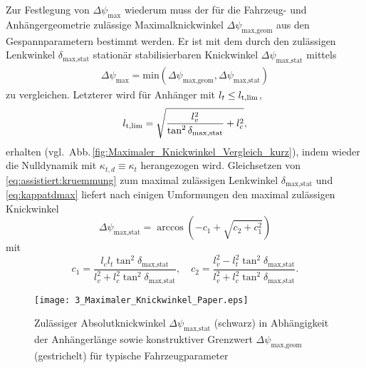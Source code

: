 Zur Festlegung von $\Delta\psi_\text{max}$ wiederum muss der für die Fahrzeug- und Anhängergeometrie zulässige Maximalknickwinkel $\Delta\psi_\text{max,geom}$ aus den Gespannparametern bestimmt werden. Er ist mit dem durch den zulässigen Lenkwinkel $\delta_{\text{max},\text{stat}}$ stationär stabilisierbaren Knickwinkel $\Delta\psi_\text{max,stat}$ mittels
\begin{align}
	\Delta\psi_\text{max} = \text{min}(\Delta\psi_\text{max,geom}, \Delta\psi_\text{max,stat})
\end{align}
 zu vergleichen. Letzterer wird für Anhänger mit $l_t \leq l_{\rm t,lim}$,
\begin{equation*}
	l_{\rm t,lim} = \sqrt{\frac{l_v^2}{\tan^2\delta_{\text{max},\text{stat}}}+l_c^2}, %
\end{equation*}
erhalten (vgl.\ Abb.\,\ref{fig:Maximaler_Knickwinkel_Vergleich_kurz}), indem wieder
die Nulldynamik mit $\kappa_{t,d} \equiv \kappa_{t}$ herangezogen wird. Gleichsetzen von \eqref{eq:assistiert:kruemmung} zum maximal zulässigen Lenkwinkel $\delta_{\text{max},\text{stat}}$ und  \eqref{eq:kappatdmax} liefert nach einigen Umformungen den maximal zulässigen Knickwinkel
\begin{equation}
	\Delta\psi_{\text{max},\text{stat}} = \arccos\left( -c_1 + \sqrt{c_2 + c_1^2} \right) \label{equ:eta_max_stat}
\end{equation}
mit
\begin{equation*}
	c_1 = \frac{l_c l_t \tan^2\delta_{\text{max},\text{stat}}}{l_v^2 + l_c^2 \tan^2\delta_{\text{max},\text{stat}}}, \quad
	c_2 = \frac{l_v^2 - l_t^2 \tan^2\delta_{\text{max},\text{stat}}}{l_v^2 + l_c^2 \tan^2\delta_{\text{max},\text{stat}}}.
\end{equation*}


\begin{figure}[ht]
	\centering
	\def\xlabel{$l_t$ in \unit{m}}
	\def\ylabel{$\Delta\psi_\text{max,geom}, \Delta\psi_\text{max,stat}$ in \unit{rad}}	
	
	\renewcommand{\matlabtextB}{\small}
	\texttt{[image: 3\_Maximaler\_Knickwinkel\_Paper.eps]}
    \caption[Zulässiger Absolutknickwinkel]{Zulässiger Absolutknickwinkel $\Delta\psi_\text{max,stat}$ (schwarz) in Abhängigkeit der Anhängerlänge sowie konstruktiver Grenzwert $\Delta\psi_\text{max,geom}$ (gestrichelt) für typische Fahrzeugparameter }
    \label{fig:Maximaler_Knickwinkel}
\end{figure}


